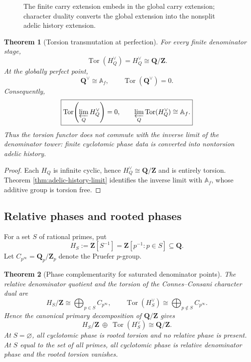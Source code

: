 \documentclass[11pt]{amsart}
\numberwithin{equation}{section}
\newtheorem{theorem}{Theorem}[section]
\theoremstyle{definition}
\newcommand{\Z}{\mathbf Z}
\newcommand{\Q}{\mathbf Q}
\newcommand{\Tor}{\operatorname{Tor}}
\begin{document}
\begin{figure}[t]
\centering
{}
\qquad
{}
\caption{The finite carry extension embeds in the global carry extension;
character duality converts the global extension into the nonsplit adelic
history extension.}
\label{fig:carry-history-extensions}
\end{figure}

\begin{theorem}[Torsion transmutation at perfection]
\label{thm:torsion-transmutation}
For every finite denominator stage,
\[
\Tor(H_Q^\vee)=H_Q^\vee\cong\Q/\Z.
\]
At the globally perfect point,
\[
\Q^\vee\cong\mathbb A_f,
\qquad
\Tor(\Q^\vee)=0.
\]
Consequently,
\[
\boxed{
\Tor\!\left(\varprojlim_QH_Q^\vee\right)=0,
\qquad
\varprojlim_Q\Tor(H_Q^\vee)\cong\mathbb A_f.}
\]
Thus the torsion functor does not commute with the inverse limit of the
denominator tower: finite cyclotomic phase data is converted into
nontorsion adelic history.
\end{theorem}

\begin{proof}
Each $H_Q$ is infinite cyclic, hence $H_Q^\vee\cong\Q/\Z$ and is entirely
torsion.  Theorem \ref{thm:adelic-history-limit} identifies the inverse
limit with $\mathbb A_f$, whose additive group is torsion free.
\end{proof}

\subsection{Relative phases and rooted phases}

For a set $S$ of rational primes, put
\[
H_S:=\Z[S^{-1}]
=\Z[p^{-1}:p\in S]\subseteq\Q.
\]
Let $C_{p^\infty}=\Q_p/\Z_p$ denote the Pruefer $p$-group.

\begin{theorem}[Phase complementarity for saturated denominator points]
\label{thm:phase-complementarity}
The relative denominator quotient and the torsion of the Connes--Consani
character dual are
\[
H_S/\Z\cong\bigoplus_{p\in S}C_{p^\infty},
\qquad
\Tor(H_S^\vee)
\cong\bigoplus_{p\notin S}C_{p^\infty}.
\]
Hence the canonical primary decomposition of $\Q/\Z$ gives
\[
\boxed{
H_S/\Z\ \oplus\ \Tor(H_S^\vee)
\cong\Q/\Z.}
\]
At $S=\varnothing$, all cyclotomic phase is rooted torsion and no relative
phase is present.  At $S$ equal to the set of all primes, all cyclotomic
phase is relative denominator phase and the rooted torsion vanishes.
\end{theorem}
\end{document}

